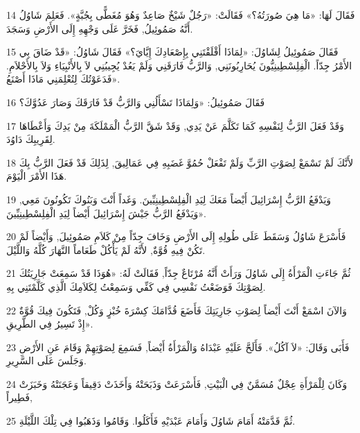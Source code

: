\par 14 فَقَالَ لَهَا: «مَا هِيَ صُورَتُهُ؟» فَقَالَتْ: «رَجُلٌ شَيْخٌ صَاعِدٌ وَهُوَ مُغَطًّى بِجُبَّةٍ». فَعَلِمَ شَاوُلُ أَنَّهُ صَمُوئِيلُ, فَخَرَّ عَلَى وَجْهِهِ إِلَى الأَرْضِ وَسَجَدَ.
\par 15 فَقَالَ صَمُوئِيلُ لِشَاوُلَ: «لِمَاذَا أَقْلَقْتَنِي بِإِصْعَادِكَ إِيَّايَ؟» فَقَالَ شَاوُلُ: «قَدْ ضَاقَ بِي الأَمْرُ جِدّاً. الْفِلِسْطِينِيُّونَ يُحَارِبُونَنِي, وَالرَّبُّ فَارَقَنِي وَلَمْ يَعُدْ يُجِيبُنِي لاَ بِالأَنْبِيَاءِ وَلاَ بِالأَحْلاَمِ. فَدَعَوْتُكَ لِتُعْلِمَنِي مَاذَا أَصْنَعُ».
\par 16 فَقَالَ صَمُوئِيلُ: «وَلِمَاذَا تَسْأَلُنِي وَالرَّبُّ قَدْ فَارَقَكَ وَصَارَ عَدُوَّكَ؟
\par 17 وَقَدْ فَعَلَ الرَّبُّ لِنَفْسِهِ كَمَا تَكَلَّمَ عَنْ يَدِي, وَقَدْ شَقَّ الرَّبُّ الْمَمْلَكَةَ مِنْ يَدِكَ وَأَعْطَاهَا لِقَرِيبِكَ دَاوُدَ.
\par 18 لأَنَّكَ لَمْ تَسْمَعْ لِصَوْتِ الرَّبِّ وَلَمْ تَفْعَلْ حُمُوَّ غَضَبِهِ فِي عَمَالِيقَ, لِذَلِكَ قَدْ فَعَلَ الرَّبُّ بِكَ هَذَا الأَمْرَ الْيَوْمَ.
\par 19 وَيَدْفَعُ الرَّبُّ إِسْرَائِيلَ أَيْضاً مَعَكَ لِيَدِ الْفِلِسْطِينِيِّينَ. وَغَداً أَنْتَ وَبَنُوكَ تَكُونُونَ مَعِي, وَيَدْفَعُ الرَّبُّ جَيْشَ إِسْرَائِيلَ أَيْضاً لِيَدِ الْفِلِسْطِينِيِّينَ».
\par 20 فَأَسْرَعَ شَاوُلُ وَسَقَطَ عَلَى طُولِهِ إِلَى الأَرْضِ وَخَافَ جِدّاً مِنْ كَلاَمِ صَمُوئِيلَ, وَأَيْضاً لَمْ تَكُنْ فِيهِ قُوَّةٌ, لأَنَّهُ لَمْ يَأْكُلْ طَعَاماً النَّهَارَ كُلَّهُ وَاللَّيْلَ.
\par 21 ثُمَّ جَاءَتِ الْمَرْأَةُ إِلَى شَاوُلَ وَرَأَتْ أَنَّهُ مُرْتَاعٌ جِدّاً, فَقَالَتْ لَهُ: «هُوَذَا قَدْ سَمِعَتْ جَارِيَتُكَ لِصَوْتِكَ فَوَضَعْتُ نَفْسِي فِي كَفِّي وَسَمِعْتُ لِكَلاَمِكَ الَّذِي كَلَّمْتَنِي بِهِ.
\par 22 وَالآنَ اسْمَعْ أَنْتَ أَيْضاً لِصَوْتِ جَارِيَتِكَ فَأَضَعَ قُدَّامَكَ كِسْرَةَ خُبْزٍ وَكُلْ, فَتَكُونَ فِيكَ قُوَّةٌ إِذْ تَسِيرُ فِي الطَّرِيقِ».
\par 23 فَأَبَى وَقَالَ: «لاَ آكُلُ». فَأَلَحَّ عَلَيْهِ عَبْدَاهُ وَالْمَرْأَةُ أَيْضاً, فَسَمِعَ لِصَوْتِهِمْ وَقَامَ عَنِ الأَرْضِ وَجَلَسَ عَلَى السَّرِيرِ.
\par 24 وَكَانَ لِلْمَرْأَةِ عِجْلٌ مُسَمَّنٌ فِي الْبَيْتِ, فَأَسْرَعَتْ وَذَبَحَتْهُ وَأَخَذَتْ دَقِيقاً وَعَجَنَتْهُ وَخَبَزَتْ فَطِيراً,
\par 25 ثُمَّ قَدَّمَتْهُ أَمَامَ شَاوُلَ وَأَمَامَ عَبْدَيْهِ فَأَكَلُوا. وَقَامُوا وَذَهَبُوا فِي تِلْكَ اللَّيْلَةِ.

